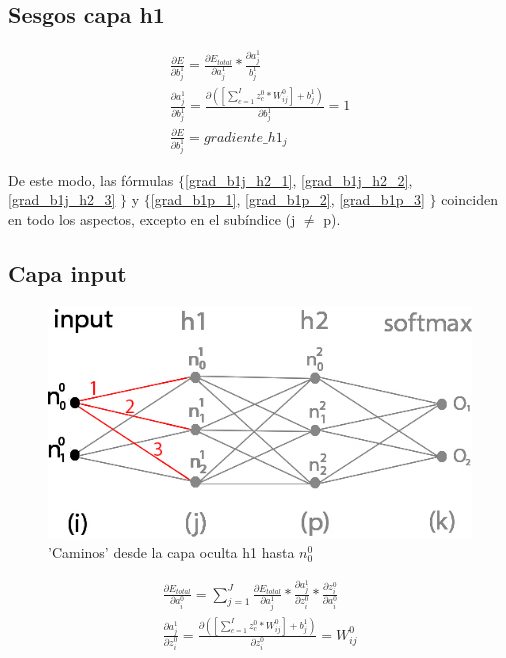 \subsection{Sesgos capa h1}

\begin{gather}
	\frac{\partial E}{\partial b^1_j} = \frac{\partial E_{total} }{\partial a^1_j } * \frac{\partial a^1_j}{b^1_j} \label{grad_b1j_h2_1} \\
	\frac{\partial a^1_j }{\partial b^1_j } = \frac{\partial ([\sum_{c=1}^{I} z^0_c * W^0_{ij}] + b^1_j) }{\partial b^1_j } = 1 \label{grad_b1j_h2_2} \\
	\frac{\partial E}{\partial b^1_j} = gradiente\_h1_j
	\label{grad_b1j_h2_3}
\end{gather}

De este modo, las fórmulas $\{$\ref{grad_b1j_h2_1}, \ref{grad_b1j_h2_2}, \ref{grad_b1j_h2_3} $\}$ y $\{$\ref{grad_b1p_1}, \ref{grad_b1p_2}, \ref{grad_b1p_3} $\}$ coinciden en todo los aspectos, excepto en el subíndice (j $\neq$ p).

\subsection{Capa input}

\begin{figure}[H]
	\centering
	\includegraphics[scale=0.35]{imagenes/nn_2_capas_caminos_posibles_input.jpg}  
	\caption{'Caminos' desde la capa oculta h1 hasta $n^0_0$}
	\label{nn_2_capas_caminos_posibles_input}
\end{figure}

\begin{gather}
	\frac{\partial E_{total}}{\partial a^0_i} = \sum_{j=1}^J \frac{\partial E_{total}}{\partial a^1_j} * \frac{\partial a^1_j}{\partial z^0_i} * \frac{\partial z^0_i}{\partial a^0_i} \label{grad_a_h2_1} \\
	\frac{\partial a^1_j }{\partial z^0_i } = \frac{\partial ([\sum_{c=1}^{I} z^0_c * W^0_{ij}] + b^1_j) }{\partial z^0_i } = W^0_{ij} \label{grad_a_h2_2}
\end{gather}

